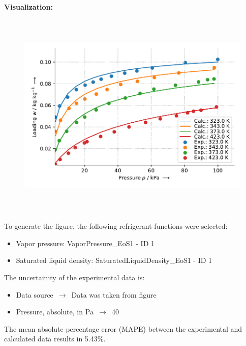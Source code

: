 \textbf{Visualization:}
%
\begin{figure}[!htp]
{\noindent\includegraphics[height=10cm, keepaspectratio]{figs/ads/ads_Propane_zeolite_pellet_5A_Toth_1.pdf}}
\end{figure}
%

To generate the figure, the following refrigerant functions were selected:
\begin{itemize}
\item Vapor pressure: VaporPressure\_EoS1 - ID 1
\item Saturated liquid density: SaturatedLiquidDensity\_EoS1 - ID 1
\end{itemize}

The uncertainity of the experimental data is:
\begin{itemize}
\item Data source $\,\to\,$ Data was taken from figure
\item Pressure, absolute, in $\si{\pascal}$ $\,\to\,$ 40
\end{itemize}

The mean absolute percentage error (MAPE) between the experimental and calculated data results in 5.43\%.
\FloatBarrier
\newpage

